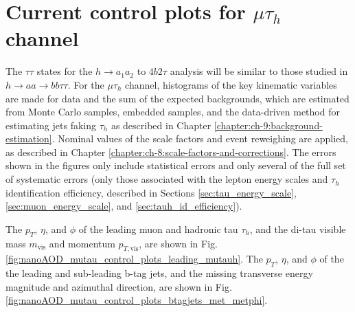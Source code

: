 \section{Current control plots for $\mu\tau_{h}$ channel}

The $\tau\tau$ states for the $h \rightarrow a_1 a_2$ to $4b2\tau$ analysis will be similar to those studied in $h\rightarrow aa \rightarrow bb\tau\tau$. For the $\mu\tau_{h}$ channel, histograms of the key kinematic variables are made for data and the sum of the expected backgrounds, which are estimated from Monte Carlo samples, embedded samples, and the data-driven method for estimating jets faking $\tau_{h}$ as described in Chapter \ref{chapter:ch-9:background-estimation}. Nominal values of the scale factors and event reweighing are applied, as described in Chapter \ref{chapter:ch-8:scale-factors-and-corrections}. The errors shown in the figures only include statistical errors and only several of the full set of systematic errors (only those associated with the lepton energy scales and $\tau_{h}$ identification efficiency, described in Sections \ref{sec:tau_energy_scale}, \ref{sec:muon_energy_scale}, and \ref{sec:tauh_id_efficiency}). 

The $p_{T}$, $\eta$, and $\phi$ of the leading muon and hadronic tau $\tau_{h}$, and the di-tau visible mass $m_{\text{vis}}$ and momentum $p_{T, \text{vis}}$, are shown in Fig. \ref{fig:nanoAOD_mutau_control_plots_leading_mutauh}. The $p_{T}$, $\eta$, and $\phi$ of the the leading and sub-leading b-tag jets, and the missing transverse energy magnitude and azimuthal direction, are shown in Fig. \ref{fig:nanoAOD_mutau_control_plots_btagjets_met_metphi}.

